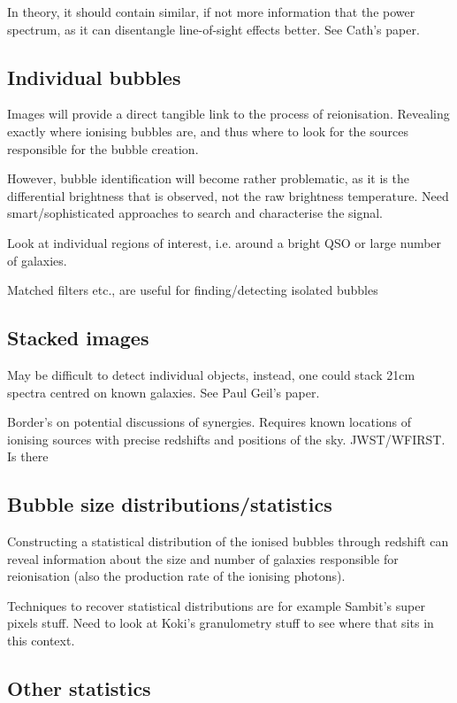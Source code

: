In theory, it should contain similar, if not more information that the power spectrum, as it can disentangle line-of-sight effects better. See Cath's paper.

\subsection{Individual bubbles}

Images will provide a direct tangible link to the process of reionisation. Revealing exactly where ionising bubbles are, and thus where to look for the sources responsible for the bubble creation. 

However, bubble identification will become rather problematic, as it is the differential brightness that is observed, not the raw brightness temperature. Need smart/sophisticated approaches to search and characterise the signal.

Look at individual regions of interest, i.e. around a bright QSO or large number of galaxies. 

Matched filters etc., are useful for finding/detecting isolated bubbles

\subsection{Stacked images}

May be difficult to detect individual objects, instead, one could stack 21cm spectra centred on known galaxies. See Paul Geil's paper.

Border's on potential discussions of synergies. Requires known locations of ionising sources with precise redshifts and positions of the sky. JWST/WFIRST. Is there 

\subsection{Bubble size distributions/statistics}

Constructing a statistical distribution of the ionised bubbles through redshift can reveal information about the size and number of galaxies responsible for reionisation (also the production rate of the ionising photons).

Techniques to recover statistical distributions are for example Sambit's super pixels stuff. Need to look at Koki's granulometry stuff to see where that sits in this context.

\subsection{Other statistics}

